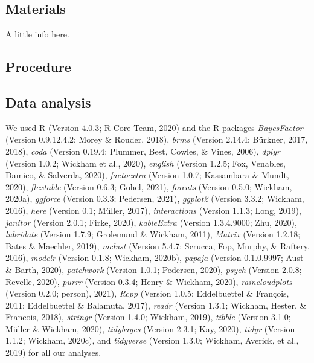 \documentclass[
  english,
  jou,floatsintext]{apa6}
\begin{document}
\hypertarget{materials}{%
\subsection{Materials}\label{materials}}

A little info here.

\hypertarget{procedure}{%
\subsection{Procedure}\label{procedure}}

\hypertarget{data-analysis}{%
\subsection{Data analysis}\label{data-analysis}}

We used R (Version 4.0.3; R Core Team, 2020) and the R-packages \emph{BayesFactor} (Version 0.9.12.4.2; Morey \& Rouder, 2018), \emph{brms} (Version 2.14.4; Bürkner, 2017, 2018), \emph{coda} (Version 0.19.4; Plummer, Best, Cowles, \& Vines, 2006), \emph{dplyr} (Version 1.0.2; Wickham et al., 2020), \emph{english} (Version 1.2.5; Fox, Venables, Damico, \& Salverda, 2020), \emph{factoextra} (Version 1.0.7; Kassambara \& Mundt, 2020), \emph{flextable} (Version 0.6.3; Gohel, 2021), \emph{forcats} (Version 0.5.0; Wickham, 2020a), \emph{ggforce} (Version 0.3.3; Pedersen, 2021), \emph{ggplot2} (Version 3.3.2; Wickham, 2016), \emph{here} (Version 0.1; Müller, 2017), \emph{interactions} (Version 1.1.3; Long, 2019), \emph{janitor} (Version 2.0.1; Firke, 2020), \emph{kableExtra} (Version 1.3.4.9000; Zhu, 2020), \emph{lubridate} (Version 1.7.9; Grolemund \& Wickham, 2011), \emph{Matrix} (Version 1.2.18; Bates \& Maechler, 2019), \emph{mclust} (Version 5.4.7; Scrucca, Fop, Murphy, \& Raftery, 2016), \emph{modelr} (Version 0.1.8; Wickham, 2020b), \emph{papaja} (Version 0.1.0.9997; Aust \& Barth, 2020), \emph{patchwork} (Version 1.0.1; Pedersen, 2020), \emph{psych} (Version 2.0.8; Revelle, 2020), \emph{purrr} (Version 0.3.4; Henry \& Wickham, 2020), \emph{raincloudplots} (Version 0.2.0; person), 2021), \emph{Rcpp} (Version 1.0.5; Eddelbuettel \& François, 2011; Eddelbuettel \& Balamuta, 2017), \emph{readr} (Version 1.3.1; Wickham, Hester, \& Francois, 2018), \emph{stringr} (Version 1.4.0; Wickham, 2019), \emph{tibble} (Version 3.1.0; Müller \& Wickham, 2020), \emph{tidybayes} (Version 2.3.1; Kay, 2020), \emph{tidyr} (Version 1.1.2; Wickham, 2020c), and \emph{tidyverse} (Version 1.3.0; Wickham, Averick, et al., 2019) for all our analyses.
\end{document}
